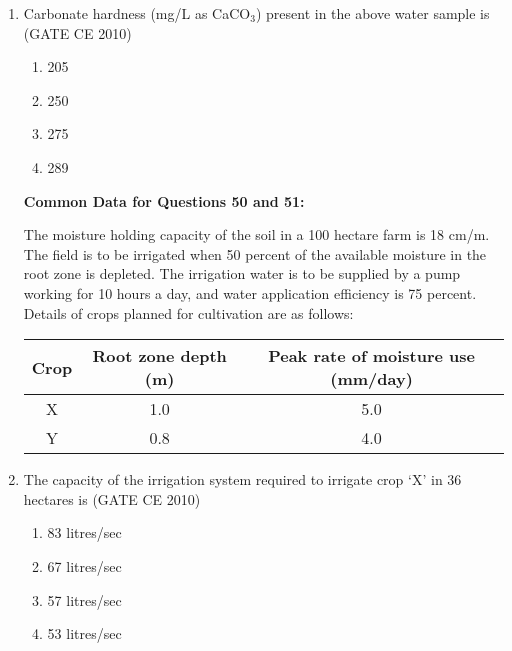 \documentclass[journal]{IEEEtran}
\begin{document}
\begin{enumerate}
    
    \item Carbonate hardness (mg/L as CaCO$_3$) present in the above water sample is \hfill (GATE CE 2010)

    \begin{multicols}{4}
        \begin{enumerate}
            \item 205
            \item 250
            \item 275
            \item 289
        \end{enumerate}
    \end{multicols}

     \textbf{Common Data for Questions 50 and 51:}

    
    The moisture holding capacity of the soil in a 100 hectare farm is 18 cm/m. The field is to be irrigated when 50 percent of the available moisture in the root zone is depleted. The irrigation water is to be supplied by a pump working for 10 hours a day, and water application efficiency is 75 percent. Details of crops planned for cultivation are as follows:

    \begin{table}[h!]
        \centering
        \begin{tabular}{|c|c|c|}
            \hline
            \textbf{Crop} & \textbf{Root zone depth (m)} & \textbf{Peak rate of moisture use (mm/day)} \\ \hline
            X & 1.0 & 5.0 \\ \hline
            Y & 0.8 & 4.0 \\ \hline
        \end{tabular}
    \end{table}

    
    \item The capacity of the irrigation system required to irrigate crop `X' in 36 hectares is \hfill (GATE CE 2010)

    \begin{multicols}{4}
        \begin{enumerate}
            \item 83 litres/sec
            \item 67 litres/sec
            \item 57 litres/sec
            \item 53 litres/sec
        \end{enumerate}
    \end{multicols}


\end{enumerate}
\end{document}
